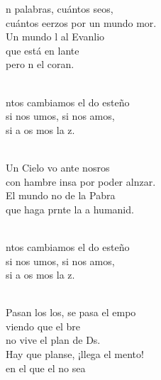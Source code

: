 \documentclass[12pt]{article}
\begin{document}
\begin{multicols*}{2}
\begin{cancion}%
	n palabras, cuántos seos,\\
	cuántos eerzos por un mundo mor.\\
	Un mundo l al Evanlio\\
	que está en lante \\
	pero n el coran. \\\jump\\
	\begin{chorus}%
	ntos cambiamos el do esteño\\
	si nos umos, si nos amos,\\
	si a os mos la z.\\
	\end{chorus}%
	\jump\\
	Un Cielo vo ante nosros\\
	con hambre insa por poder alnzar.\\
	El mundo no de la Pabra\\
	que haga prnte la a humanid.\\\jump\\
	\begin{chorus}%
	ntos cambiamos el do esteño\\
	si nos umos, si nos amos,\\
	si a os mos la z.\\
	\end{chorus}%
	\jump\\
	Pasan los los, se pasa el empo\\
	viendo que el bre \\
	no vive el plan de Ds.\\
	Hay que planse, ¡llega el mento!\\
	en el que el no sea \\

\end{cancion}
\end{multicols*}
\end{document}
